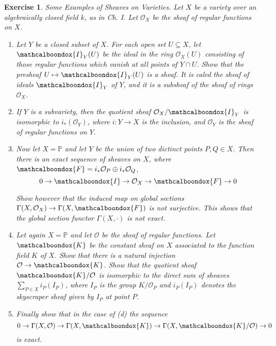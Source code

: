 \documentclass[12pt]{article}
\newcommand{\locO}{\ensuremath{\mathcal{O}}}
\newtheorem{ex}{Exercise}[section]
\theoremstyle{definition}
\newcommand{\sF}{\ensuremath{\mathcalboondox{F}}}
\newcommand{\sI}{\ensuremath{\mathcalboondox{I}}}
\begin{document}
\begin{ex}
	Some Examples of Sheaves on Varieties. Let $X$ be a variety over an algebraically closed field $k$, as in Ch. I. Let $\locO_X$ be the sheaf of regular functions on $X$.
	\begin{enumerate}[label = \alph*)]
		\item Let $Y$ be a closed subset of $X$. For each open set $U \subseteq X$, let $\sI_Y(U)$ be the ideal in the ring $\locO_X(U)$ consisting of those regular functions which vanish at all points of $Y \cap U$. Show that the presheaf $U \mapsto \sI_Y(U)$ is a sheaf. It is caled the sheaf of ideals $\sI_Y$ of $Y$, and it is a subsheaf of the sheaf of rings $\locO_X$.

		\item If $Y$ is a subvariety, then the quotient sheaf $\locO_X / \sI_Y$ is isomorphic to $i_*(\locO_Y)$, where $i: Y \to X$ is the inclusion, and $\locO_Y$ is the sheaf of regular functions on $Y$.

		\item Now let $X = \mathbb{P}$ and let $Y$ be the union of two dictinct points $P, Q \in X$. Then there is an exact sequence of sheaves on $X$, where $\sF = i_* \locO_P \oplus i_* \locO_Q$,
		\[
			0 \to \sI \to \locO_X \to \sF \to 0
		\]

		Show however that the induced map on global sections $\Gamma(X, \locO_X) \to \Gamma(X, \sF)$ is not surjective. This shows that the global section functor $\Gamma(X,·)$ is not exact.

		\item Let again $X = \mathbb{P}$ and let $\locO$ be the sheaf of regular functions. Let $\mathcalboondox{K}$ be the constant sheaf on $X$ associated to the function field $K$ of $X$. Show that there is a natural injection $\locO \to \mathcalboondox{K}$. Show that the quotient sheaf $\mathcalboondox{K}/\locO$ is isomorphic to the direct sum of sheaves $\sum_{P \in X}i_P(I_P)$, where $I_P$ is the group $K/\locO_P$ and $i_P(I_P)$ denotes the skyscraper sheaf given by $I_P$ at point $P$.

		\item Finally show that in the case of (d) the sequence 
		\[
			0 \to \Gamma(X, \locO) \to \Gamma(X, \mathcalboondox{K}) \to \Gamma(X, \mathcalboondox{K}/\locO) \to 0
		\]
		is exact.
	\end{enumerate}
\end{ex}
\end{document}
